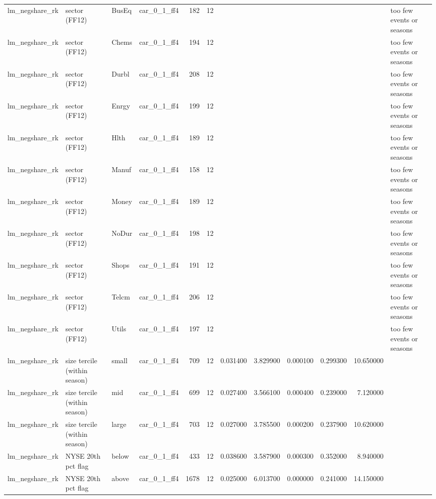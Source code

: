 \begin{table}
\begin{tabular}{llllrrrrrrrl}
lm\_negshare\_rk & sector (FF12) & BusEq & car\_0\_1\_ff4 & 182 & 12 &  &  &  &  &  & too few events or seasons \\
lm\_negshare\_rk & sector (FF12) & Chems & car\_0\_1\_ff4 & 194 & 12 &  &  &  &  &  & too few events or seasons \\
lm\_negshare\_rk & sector (FF12) & Durbl & car\_0\_1\_ff4 & 208 & 12 &  &  &  &  &  & too few events or seasons \\
lm\_negshare\_rk & sector (FF12) & Enrgy & car\_0\_1\_ff4 & 199 & 12 &  &  &  &  &  & too few events or seasons \\
lm\_negshare\_rk & sector (FF12) & Hlth & car\_0\_1\_ff4 & 189 & 12 &  &  &  &  &  & too few events or seasons \\
lm\_negshare\_rk & sector (FF12) & Manuf & car\_0\_1\_ff4 & 158 & 12 &  &  &  &  &  & too few events or seasons \\
lm\_negshare\_rk & sector (FF12) & Money & car\_0\_1\_ff4 & 189 & 12 &  &  &  &  &  & too few events or seasons \\
lm\_negshare\_rk & sector (FF12) & NoDur & car\_0\_1\_ff4 & 198 & 12 &  &  &  &  &  & too few events or seasons \\
lm\_negshare\_rk & sector (FF12) & Shops & car\_0\_1\_ff4 & 191 & 12 &  &  &  &  &  & too few events or seasons \\
lm\_negshare\_rk & sector (FF12) & Telcm & car\_0\_1\_ff4 & 206 & 12 &  &  &  &  &  & too few events or seasons \\
lm\_negshare\_rk & sector (FF12) & Utils & car\_0\_1\_ff4 & 197 & 12 &  &  &  &  &  & too few events or seasons \\
lm\_negshare\_rk & size tercile (within season) & small & car\_0\_1\_ff4 & 709 & 12 & 0.031400 & 3.829900 & 0.000100 & 0.299300 & 10.650000 &  \\
lm\_negshare\_rk & size tercile (within season) & mid & car\_0\_1\_ff4 & 699 & 12 & 0.027400 & 3.566100 & 0.000400 & 0.239000 & 7.120000 &  \\
lm\_negshare\_rk & size tercile (within season) & large & car\_0\_1\_ff4 & 703 & 12 & 0.027000 & 3.785500 & 0.000200 & 0.237900 & 10.620000 &  \\
lm\_negshare\_rk & NYSE 20th pct flag & below & car\_0\_1\_ff4 & 433 & 12 & 0.038600 & 3.587900 & 0.000300 & 0.352000 & 8.940000 &  \\
lm\_negshare\_rk & NYSE 20th pct flag & above & car\_0\_1\_ff4 & 1678 & 12 & 0.025000 & 6.013700 & 0.000000 & 0.241000 & 14.150000 &  \\

\end{tabular}
\end{table}

